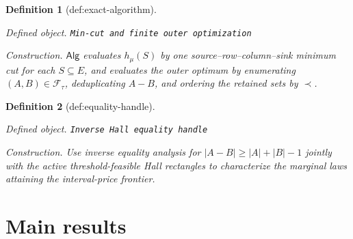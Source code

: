 \documentclass{article}
\newtheorem{definition}{Definition}
\begin{document}
\begin{definition}[def:exact-algorithm]\label{def:exact-algorithm}
\par\smallskip\noindent\emph{Defined object.} \texttt{Min-\allowbreak{}cut and finite outer optimization}
\par\smallskip\noindent\emph{Construction.} \(\mathsf{Alg}\) evaluates \(h_{\mu}(S)\) by one source--row--column--sink minimum cut for each \(S\subseteq E\), and evaluates the outer optimum by enumerating \((A,B)\in\mathcal F_{\tau}\), deduplicating \(A-B\), and ordering the retained sets by \(\prec\).
\end{definition}

\begin{definition}[def:equality-handle]\label{def:equality-handle}
\par\smallskip\noindent\emph{Defined object.} \texttt{Inverse Hall equality handle}
\par\smallskip\noindent\emph{Construction.} Use inverse equality analysis for \(|A-B|\geq|A|+|B|-1\) jointly with the active threshold-feasible Hall rectangles to characterize the marginal laws attaining the interval-price frontier.
\end{definition}

\section{Main results}
\end{document}
